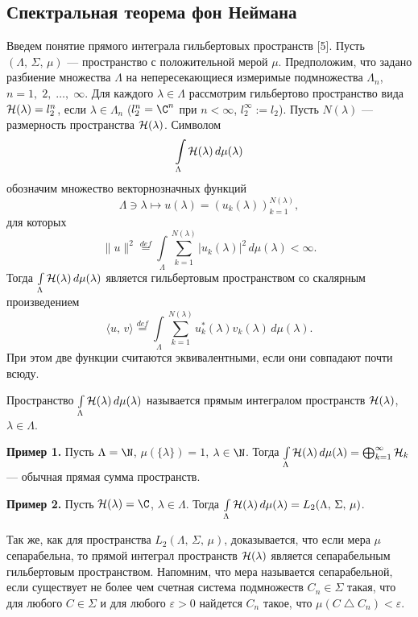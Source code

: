 \documentclass[a4paper
]{article}
\begin{document}
\subsection{Спектральная теорема фон Неймана}
Введем понятие прямого интеграла гильбертовых пространств [5].
Пусть $(\Lambda, \, \Sigma, \, \mu)$ --- пространство
с положительной мерой $\mu$. Предположим, что задано разбиение
множества $\Lambda$ на непересекающиеся измеримые подмножества
$\Lambda_n$, $n=1, \; 2, \;\dots, \; \infty$. Для каждого $\lambda\in
\Lambda$ рассмотрим гильбертово пространство вида ${\cal H}(\lambda)=l_2^n$, если
$\lambda\in \Lambda_n$ ($l_2^n=\C^n$ при $n<\infty$,
$l_2^\infty:=l_2$). Пусть $N(\lambda)$ --- размерность пространства
${\cal H}(\lambda)$.
Символом $$\int \limits_{\Lambda}{\cal H}(\lambda)\, d\mu(\lambda)$$
обозначим множество векторнозначных функций
$$\Lambda\ni \lambda\mapsto u(\lambda)=(u_k(\lambda))_{k=1}^{N(\lambda)},$$
для которых $$\|u\|^2\stackrel{def}{=} \int \limits_{\Lambda}\sum
\limits _{k=1}^{N(\lambda)}|u_k(\lambda)|^2\, d\mu(\lambda)<\infty.$$
Тогда $\int \limits_{\Lambda}{\cal H}(\lambda)\, d\mu(\lambda)$ является
гильбертовым пространством со скалярным произведением
$$\langle u, \, v\rangle\stackrel{def}{=}\int \limits_{\Lambda}\sum
\limits _{k=1}^{N(\lambda)}u_k^*(\lambda)v_k(\lambda)\,
d\mu(\lambda).$$ При этом две функции считаются эквивалентными, если
они совпадают почти всюду. \par
\begin{Def}
Пространство $\int \limits_{\Lambda}{\cal H}(\lambda)\, d\mu(\lambda)$
называется прямым интегралом пространств ${\cal H}(\lambda)$, $\lambda\in
\Lambda$.
\end{Def}
{\bf Пример 1.} Пусть $\Lambda =\N$, $\mu(\{\lambda\})=1$, $\lambda\in \N$. Тогда
$\int \limits_{\Lambda}{\cal H}(\lambda)\, d\mu(\lambda)=\bigoplus _{k=1}
^\infty {\cal H}_k$ --- обычная прямая сумма пространств. \par
{\bf Пример 2.} Пусть ${\cal H}(\lambda)=\C$, $\lambda\in \Lambda$.
Тогда $\int \limits_{\Lambda}{\cal H}(\lambda)\, d\mu(\lambda)=L_2(\Lambda,
\, \Sigma, \, \mu)$. \par
Так же, как для пространства $L_2(\Lambda, \, \Sigma, \, \mu)$,
доказывается, что если мера $\mu$ сепарабельна, то прямой интеграл
пространств ${\cal H}(\lambda)$ является сепарабельным гильбертовым
пространством. Напомним, что мера называется сепарабельной, если
существует не более чем счетная система подмножеств $C_n\in \Sigma$
такая, что для любого $C\in \Sigma$ и для любого $\varepsilon>0$
найдется $C_n$ такое, что $\mu(C\bigtriangleup C_n)<\varepsilon$.
\end{document}

